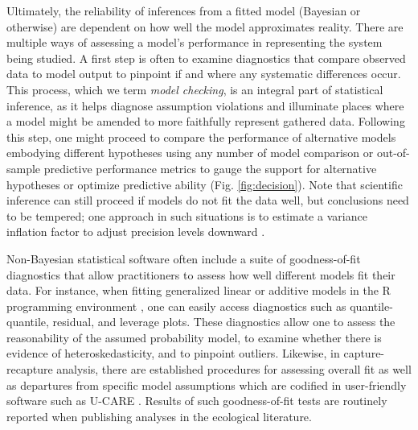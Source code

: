 \documentclass[12pt,english]{article}
\begin{document}
\begin{spacing}{1.9}
Ultimately, the reliability of inferences from a fitted model (Bayesian or otherwise) are dependent on how well the model approximates reality.  There are multiple ways of assessing a model's performance in representing the system being studied. A first step is often to examine diagnostics that compare observed data to model output to pinpoint if and where any systematic differences occur. This process, which we term \textit{model checking}, is an integral part of statistical inference, as it helps diagnose assumption violations and illuminate places where a model might be amended to more faithfully represent gathered data. Following this step, one might proceed to compare the performance of alternative models embodying different hypotheses using any number of model comparison or out-of-sample predictive performance metrics \citep[see][for a review]{HootenHobbs2015} to gauge the support for alternative hypotheses or optimize predictive ability (Fig. \ref{fig:decision}).  Note that scientific inference can still proceed if models do not fit the data well, but conclusions need to be tempered; one approach in such situations is to estimate a variance inflation factor to adjust precision levels downward \citep[e.g.][]{CoxSnell1989,McCullaghNelder1989}.

Non-Bayesian statistical software often include a suite of goodness-of-fit diagnostics that allow practitioners to assess how well different models fit their data.  For instance, when fitting generalized linear \citep{McCullaghNelder1989} or additive \citep{Wood2006} models in the R programming environment \citep{RTeam2015}, one can easily access diagnostics such as quantile-quantile, residual, and leverage plots.  These diagnostics allow one to assess the reasonability of the assumed probability model, to examine whether there is evidence of heteroskedasticity, and to pinpoint outliers.  Likewise, in capture-recapture analysis, there are established procedures for assessing overall fit as well as departures from specific model assumptions which are codified in user-friendly software such as U-CARE \citep{ChoquetEtAl2009}.  Results of such goodness-of-fit tests are routinely reported when publishing analyses in the ecological literature.


\end{spacing}
\end{document}
